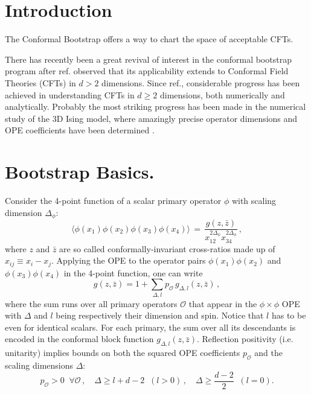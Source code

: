 \documentclass[letterpaper]{article}
\numberwithin{equation}{section}
\begin{document}
\maketitle

\section{Introduction}
The Conformal Bootstrap offers a way to chart the space of acceptable CFTs. 

There has recently been a great revival of interest in the conformal bootstrap program \cite{Ferrara:1973yt,Polyakov:1974gs} after ref.\cite{Rattazzi:2008pe} observed that 
its applicability extends to Conformal Field Theories (CFTs) in $d>2$ dimensions. 
Since ref.\cite{Rattazzi:2008pe}, considerable progress has been achieved in understanding CFTs in $d\geq 2$ dimensions, both numerically and analytically.
Probably the most striking progress has been made in the numerical study of the 3D Ising model,
where amazingly precise operator dimensions and OPE coefficients have been determined
\cite{ElShowk:2012ht,El-Showk:2014dwa,Kos:2016ysd}.


\section{Bootstrap Basics.}
Consider the 4-point function of a scalar primary operator $\phi$ with scaling dimension $\Delta_\phi$: 
\begin{equation}
\label{4-point-function}
\langle \phi(x_1) \phi(x_2) \phi(x_3) \phi(x_4) \rangle \, = \, \frac{g(z,\bar z)}{x_{12}^{2\Delta_\phi}x_{34}^{2\Delta_\phi} } \,,
\end{equation}
where $z$ and $\bar z$ are so called conformally-invariant cross-ratios made up of $x_{ij}\equiv x_i-x_j$.
Applying the OPE to the operator pairs $\phi(x_1) \phi(x_2)$ and $\phi(x_3) \phi(x_4)$ in the 4-point function, one can write
\begin{equation}
g(z,\bar z) = 1+\sum_{\Delta ,l } p_{\mathcal{O}} \, g_{\Delta,l}(z,\bar z) \,, 
\label{CBExp}
 \end{equation}
where the sum runs over all primary operators $\mathcal{O}$ that appear in the $\phi\times \phi$ OPE with  $\Delta$ and $l$ being respectively their dimension and spin. Notice that $l$ has to be even
for identical scalars. For each primary, the sum over all its descendants is encoded in the conformal block function $g_{\Delta,l}(z,\bar z)$. Reflection positivity (i.e. unitarity) implies bounds on both the squared OPE coefficients $p_{\mathcal{O}}$
and the scaling dimensions $\Delta$:
\begin{equation}
p_{\mathcal{O}} >0 \;\; \forall \mathcal{O}\,,  \quad
 \Delta \geq l+d-2 \;\; (l>0)\,, \quad \Delta \geq \frac{d-2}2 \;\; (l=0).
  \label{unit-bound}
\end{equation}
\end{document}

